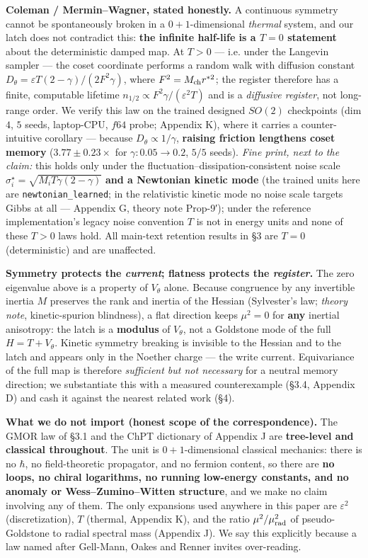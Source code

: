 \documentclass[10pt]{article}
\begin{document}
\textbf{Coleman / Mermin--Wagner, stated honestly.} A continuous symmetry cannot be spontaneously broken in a $0{+}1$-dimensional \emph{thermal} system, and our latch does not contradict this: \textbf{the infinite half-life is a $T=0$ statement} about the deterministic damped map. At $T>0$ --- i.e. under the Langevin sampler --- the coset coordinate performs a random walk with diffusion constant $D_\theta=\varepsilon T(2-\gamma)/(2F^2\gamma)$, where $F^2=M_{\rm ch}r^{*2}$; the register therefore has a finite, computable lifetime $n_{1/2}\propto F^2\gamma/(\varepsilon^2T)$ and is a \emph{diffusive register}, not long-range order. We verify this law on the trained designed $SO(2)$ checkpoints (dim $4$, $5$ seeds, laptop-CPU, $f64$ probe; Appendix K), where it carries a counter-intuitive corollary --- because $D_\theta\propto1/\gamma$, \textbf{raising friction lengthens coset memory} ($3.77\pm0.23\times$ for $\gamma:0.05\to0.2$, $5/5$ seeds). \emph{Fine print, next to the claim:} this holds only under the fluctuation--dissipation-consistent noise scale $\sigma^\star_i=\sqrt{M_iT\gamma(2-\gamma)}$ \textbf{and a Newtonian kinetic mode} (the trained units here are \texttt{newtonian\_learned}; in the relativistic kinetic mode no noise scale targets Gibbs at all --- Appendix G, theory note Prop-9′); under the reference implementation's legacy noise convention $T$ is not in energy units and none of these $T>0$ laws hold. All main-text retention results in \S3 are $T=0$ (deterministic) and are unaffected.

\textbf{Symmetry protects the \emph{current}; flatness protects the \emph{register}.} The zero eigenvalue above is a property of $V_\theta$ alone. Because congruence by any invertible inertia $M$ preserves the rank and inertia of the Hessian (Sylvester's law; \emph{theory note}, kinetic-spurion blindness), a flat direction keeps $\mu^2=0$ for \textbf{any} inertial anisotropy: the latch is a \textbf{modulus} of $V_\theta$, not a Goldstone mode of the full $H=T+V_\theta$. Kinetic symmetry breaking is invisible to the Hessian and to the latch and appears only in the Noether charge --- the write current. Equivariance of the full map is therefore \emph{sufficient but not necessary} for a neutral memory direction; we substantiate this with a measured counterexample (\S3.4, Appendix D) and cash it against the nearest related work (\S4).

\textbf{What we do not import (honest scope of the correspondence).} The GMOR law of \S3.1 and the ChPT dictionary of Appendix J are \textbf{tree-level and classical throughout}. The unit is $0{+}1$-dimensional classical mechanics: there is no $\hbar$, no field-theoretic propagator, and no fermion content, so there are \textbf{no loops, no chiral logarithms, no running low-energy constants, and no anomaly or Wess--Zumino--Witten structure}, and we make no claim involving any of them. The only expansions used anywhere in this paper are $\varepsilon^2$ (discretization), $T$ (thermal, Appendix K), and the ratio $\mu^2/\mu_{\rm rad}^2$ of pseudo-Goldstone to radial spectral mass (Appendix J). We say this explicitly because a law named after Gell-Mann, Oakes and Renner invites over-reading.
\end{document}
